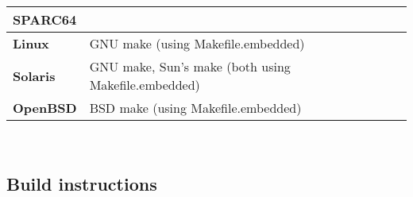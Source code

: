 \begin{tabular}{l l}
{\bf{\large SPARC64}}         &                                                      \\
\hline\hline
{\bf Linux}                   & GNU make (using Makefile.embedded)                   \\
{\bf Solaris}                 & GNU make, Sun's make (both using Makefile.embedded)  \\
{\bf OpenBSD}                 & BSD make (using Makefile.embedded)                   \\
\hline

\end{tabular}\\

\pagebreak

\subsection{Build instructions}


